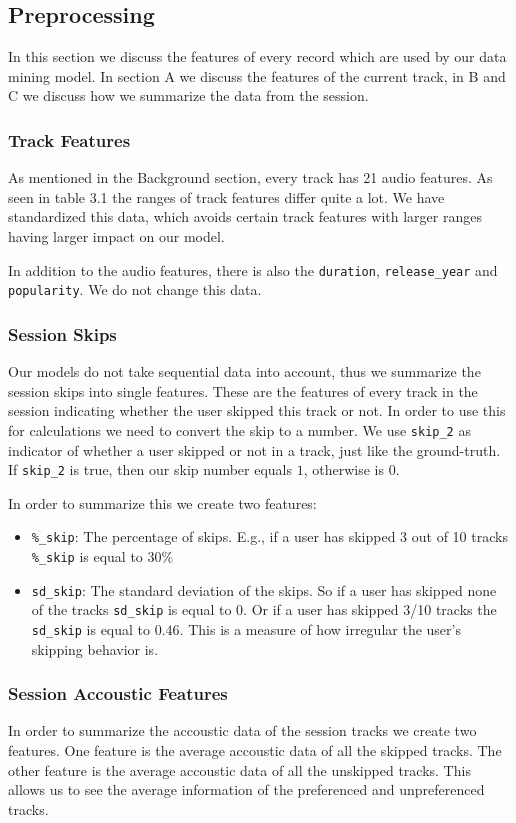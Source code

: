 \documentclass[conference]{IEEEtran}
\begin{document}
\subsection{Preprocessing}
In this section we discuss the features of every record which are used by our data mining model.
In section A we discuss the features of the current track, in B and C we discuss how we summarize the data from the session.

\subsubsection{Track Features}
As mentioned in the Background section, every track has 21 audio features.
As seen in table 3.1 the ranges of track features differ quite a lot.
We have standardized this data, which avoids certain track features with larger ranges having larger impact on our model. 


In addition to the audio features, there is also the \verb|duration|, \verb|release_year| and 
\verb|popularity|.
We do not change this data.

\subsubsection{Session Skips}
Our models do not take sequential data into account, 
thus we summarize the session skips into single features. 
These are the features of every track in the session indicating whether the user skipped this track or not.
In order to use this for calculations we need to convert the skip to a number. 
We use \verb|skip_2| as indicator of whether a user skipped or not in a track, 
just like the ground-truth. 
If \verb|skip_2| is true, then our skip number equals $1$, 
otherwise is $0$.

In order to summarize this we create two features:
\begin{itemize}
	\item \verb|%_skip|: The percentage of skips. 
		E.g., if a user has skipped 3 out of 10 tracks \verb|%_skip| is equal to $30\%$
	\item \verb|sd_skip|: The standard deviation of the skips. 
	So if a user has skipped none of the tracks \verb|sd_skip| is equal to 0. 
	Or if a user has skipped 3/10 tracks the \verb|sd_skip| is equal to $0.46$.
	This is a measure of how irregular the user's skipping behavior is.
\end{itemize}


\subsubsection{Session Accoustic Features}
In order to summarize the accoustic data of the session tracks we create two features. 
One feature is the average accoustic data of all the skipped tracks. 
The other feature is the average accoustic data of all the unskipped tracks.
This allows us to see the average information of the preferenced and unpreferenced tracks.
\end{document}
